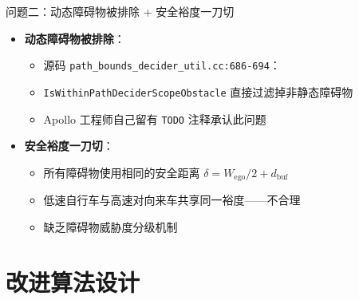 \documentclass[aspectratio=169,10pt,fontset=none]{ctexbeamer}
\begin{document}
\begin{frame}{问题二：动态障碍物被排除 + 安全裕度一刀切}
  \begin{itemize}
    \item \textbf{动态障碍物被排除}：
      \begin{itemize}
        \item 源码 \texttt{path\_bounds\_decider\_util.cc:686-694}：
        \item[] \texttt{IsWithinPathDeciderScopeObstacle} 直接过滤掉非静态障碍物
        \item Apollo 工程师自己留有 \texttt{TODO} 注释承认此问题
      \end{itemize}

    \vspace{0.3cm}
    \item \textbf{安全裕度一刀切}：
      \begin{itemize}
        \item 所有障碍物使用相同的安全距离 $\delta = W_{\text{ego}}/2 + d_{\text{buf}}$
        \item 低速自行车与高速对向来车共享同一裕度——不合理
        \item 缺乏障碍物威胁度分级机制
      \end{itemize}
  \end{itemize}
\end{frame}

\section{改进算法设计}
\end{document}
